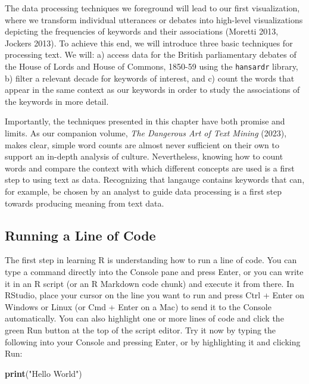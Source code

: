 \documentclass[
]{article}
\newenvironment{Shaded}{\begin{snugshade}}{\end{snugshade}}
\newcommand{\FunctionTok}[1]{\textcolor[rgb]{0.13,0.29,0.53}{\textbf{#1}}}
\newcommand{\NormalTok}[1]{#1}
\newcommand{\StringTok}[1]{\textcolor[rgb]{0.31,0.60,0.02}{#1}}
\begin{document}
The data processing techniques we foreground will lead to our first
visualization, where we transform individual utterances or debates into
high-level visualizations depicting the frequencies of keywords and
their associations (Moretti 2013, Jockers 2013). To achieve this end, we
will introduce three basic techniques for processing text. We will: a)
access data for the British parliamentary debates of the House of Lords
and House of Commons, 1850-59 using the \texttt{hansardr} library, b)
filter a relevant decade for keywords of interest, and c) count the
words that appear in the same context as our keywords in order to study
the associations of the keywords in more detail.

Importantly, the techniques presented in this chapter have both promise
and limits. As our companion volume, \emph{The Dangerous Art of Text
Mining} (2023), makes clear, simple word counts are almost never
sufficient on their own to support an in-depth analysis of culture.
Nevertheless, knowing how to count words and compare the context with
which different concepts are used is a first step to using text as data.
Recognizing that langauge contains keywords that can, for example, be
chosen by an analyst to guide data processing is a first step towards
producing meaning from text data.

\subsection{Running a Line of Code}\label{running-a-line-of-code}

The first step in learning R is understanding how to run a line of code.
You can type a command directly into the Console pane and press Enter,
or you can write it in an R script (or an R Markdown code chunk) and
execute it from there. In RStudio, place your cursor on the line you
want to run and press Ctrl + Enter on Windows or Linux (or Cmd + Enter
on a Mac) to send it to the Console automatically. You can also
highlight one or more lines of code and click the green Run button at
the top of the script editor. Try it now by typing the following into
your Console and pressing Enter, or by highlighting it and clicking Run:

\begin{Shaded}
\begin{Highlighting}[]
\FunctionTok{print}\NormalTok{(}\StringTok{"Hello World"}\NormalTok{)}
\end{Highlighting}
\end{Shaded}
\end{document}
